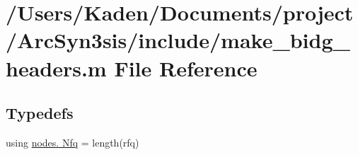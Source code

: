 \hypertarget{a00473}{}\section{/\+Users/\+Kaden/\+Documents/project/\+Arc\+Syn3sis/include/make\+\_\+bidg\+\_\+headers.m File Reference}
\label{a00473}
\subsection*{Typedefs}
\begin{DoxyCompactItemize}
\item 
using \hyperlink{a00473_a48bce0fe5ec77a5530854f31d096cf97}{nodes. Nfq} = length(rfq)
\end{DoxyCompactItemize}
